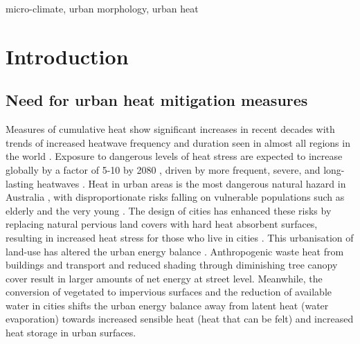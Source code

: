\documentclass[final,3p,times,authoryear]{elsarticle}
\begin{document}
\begin{keyword}
micro-climate\sep 
urban morphology\sep
urban heat
\end{keyword}



\maketitle

\section{Introduction}

\subsection{Need for urban heat mitigation measures}

Measures of cumulative heat show significant increases in recent decades with trends of increased heatwave frequency and duration seen in almost all regions in the world \citep{Perkins-Kirkpatrick2020}. Exposure to dangerous levels of heat stress are expected to increase globally by a factor of 5-10 by 2080 \citep{Coffel2018}, driven by more frequent, severe, and long-lasting heatwaves \citep{IPCC2013a}. Heat in urban areas is the most dangerous natural hazard in Australia \citep{Coates2014}, with disproportionate risks falling on vulnerable populations such as elderly and the very young \citep{Nicholls2008}. The design of cities has enhanced these risks by replacing natural pervious land covers with hard heat absorbent surfaces, resulting in increased heat stress for those who live in cities \citep{Coutts2012,Martilli2020}. This urbanisation of land-use has altered the urban energy balance \citep{Oke1982}. Anthropogenic waste heat from buildings and transport and reduced shading through diminishing tree canopy cover result in larger amounts of net energy at street level. Meanwhile, the conversion of vegetated to impervious surfaces and the reduction of available water in cities shifts the urban energy balance away from latent heat (water evaporation) towards increased sensible heat (heat that can be felt) and increased heat storage in urban surfaces. 
\end{document}
